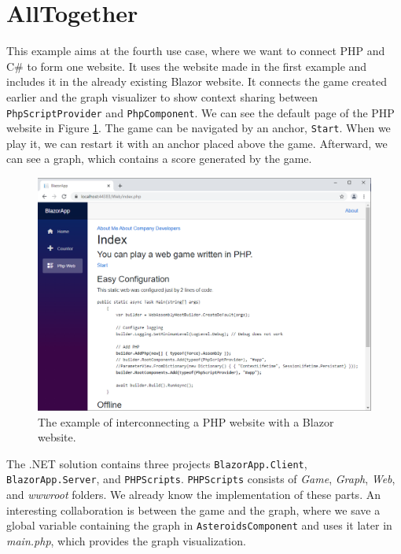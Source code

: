 \section{AllTogether}

This example aims at the fourth use case, where we want to connect PHP and C\# to form one website.
It uses the website made in the first example and includes it in the already existing Blazor website.
It connects the game created earlier and the graph visualizer to show context sharing between \texttt{PhpScriptProvider} and \texttt{PhpComponent}.
We can see the default page of the PHP website in Figure \ref{img30:allTogether}.
The game can be navigated by an anchor, \texttt{Start}.
When we play it, we can restart it with an anchor placed above the game.
Afterward, we can see a graph, which contains a score generated by the game. 
\par
\begin{figure}\centering
\includegraphics[scale=0.5]{./img/AllTogether}
\caption{The example of interconnecting a PHP website with a Blazor website.}
\label{img30:allTogether}
\end{figure} 
\par
The .NET solution contains three projects \texttt{BlazorApp.Client}, \texttt{BlazorApp.Server}, and \texttt{PHPScripts}.
\texttt{PHPScripts} consists of \textit{Game}, \textit{Graph}, \textit{Web}, and \textit{wwwroot} folders.
We already know the implementation of these parts.
An interesting collaboration is between the game and the graph, where we save a global variable containing the graph in \texttt{AsteroidsComponent} and uses it later in \textit{main.php}, which provides the graph visualization.
